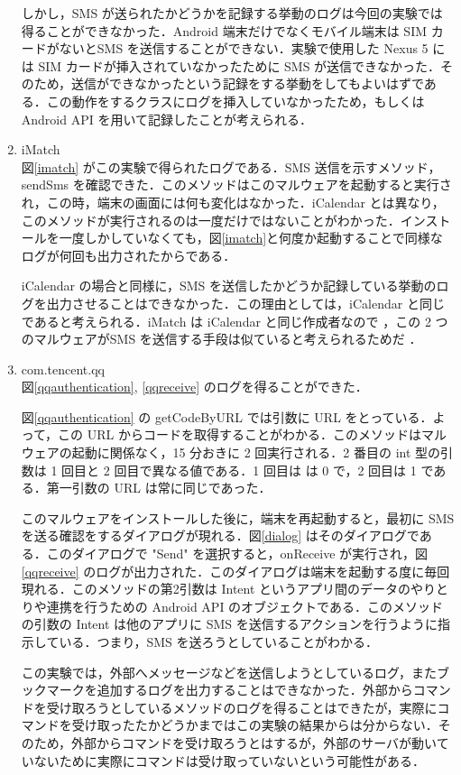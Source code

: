 \begin{enumerate}
	しかし，SMS が送られたかどうかを記録する挙動のログは今回の実験では得ることができなかった．Android 端末だけでなくモバイル端末は SIM カードがないとSMS を送信することができない．実験で使用した Nexus 5 には SIM カードが挿入されていなかったために SMS が送信できなかった．そのため，送信ができなかったという記録をする挙動をしてもよいはずである．この動作をするクラスにログを挿入していなかったため，もしくは Android API を用いて記録したことが考えられる．
	\item iMatch \mbox{}\\
	図\ref{imatch} がこの実験で得られたログである．SMS 送信を示すメソッド，sendSms を確認できた．このメソッドはこのマルウェアを起動すると実行され，この時，端末の画面には何も変化はなかった．iCalendar とは異なり，このメソッドが実行されるのは一度だけではないことがわかった．インストールを一度しかしていなくても，図\ref{imatch}と何度か起動することで同様なログが何回も出力されたからである．
	
	iCalendar の場合と同様に，SMS を送信したかどうか記録している挙動のログを出力させることはできなかった．この理由としては，iCalendar と同じであると考えられる．iMatch は iCalendar と同じ作成者なので \cite{icalendar}，この 2 つのマルウェアがSMS を送信する手段は似ていると考えられるためだ ．
\item com.tencent.qq \mbox{}\\
	図\ref{qqauthentication},  \ref{qqreceive} のログを得ることができた．
	
	図\ref{qqauthentication} の getCodeByURL では引数に URL をとっている．よって，この URL からコードを取得することがわかる．このメソッドはマルウェアの起動に関係なく，15 分おきに 2 回実行される．2 番目の int 型の引数は 1 回目と 2 回目で異なる値である．1 回目は は 0 で，2 回目は 1 である．第一引数の URL は常に同じであった．
	
	このマルウェアをインストールした後に，端末を再起動すると，最初に SMS を送る確認をするダイアログが現れる．図\ref{dialog} はそのダイアログである．このダイアログで "Send" を選択すると，onReceive が実行され，図\ref{qqreceive} のログが出力された．このダイアログは端末を起動する度に毎回現れる．このメソッドの第2引数は Intent というアプリ間のデータのやりとりや連携を行うための Android API のオブジェクトである．このメソッドの引数の Intent は他のアプリに SMS を送信するアクションを行うように指示している．つまり，SMS を送ろうとしていることがわかる．
	
	この実験では，外部へメッセージなどを送信しようとしているログ，またブックマークを追加するログを出力することはできなかった．外部からコマンドを受け取ろうとしているメソッドのログを得ることはできたが，実際にコマンドを受け取ったたかどうかまではこの実験の結果からは分からない．そのため，外部からコマンドを受け取ろうとはするが，外部のサーバが動いていないために実際にコマンドは受け取っていないという可能性がある．	
\end{enumerate}


